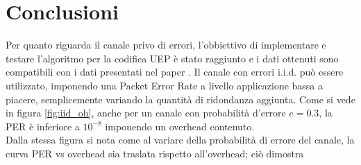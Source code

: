 \documentclass[italian, a4paper, 12pt]{article}
\begin{document}
\section{Conclusioni} %
Per quanto riguarda il canale privo di errori, l'obbiettivo di implementare e testare l'algoritmo per la codifica UEP è stato raggiunto e i dati ottenuti sono compatibili con i dati
presentati nel paper \cite{uep}.
Il canale con errori i.i.d. può essere utilizzato, imponendo una
Packet Error Rate a livello applicazione bassa a piacere, semplicemente variando la quantità di ridondanza aggiunta.
Come si vede in figura \ref{fig:iid_oh}, anche per un canale con probabilità d'errore
 $e = 0.3$, la PER è inferiore a $10^{-8}$ imponendo un overhead contenuto.\\
Dalla stessa figura si nota come al variare della probabilità di
errore del canale, la curva PER vs overhead sia traslata rispetto all'overhead; ciò dimostra
\end{document}
